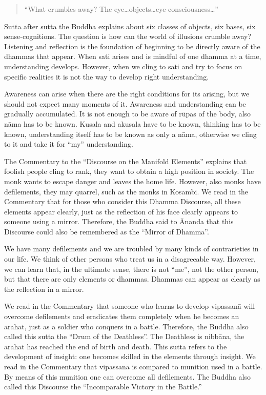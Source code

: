 \begin{quote}
``What crumbles away? The eye\ldots objects\ldots eye-consciousness\ldots ''
\end{quote}

Sutta after sutta the Buddha explains about six classes of objects, six bases, six sense-cognitions.
The question is how can the world of illusions crumble away? Listening and reflection is the foundation of beginning to be directly aware of the dhammas that appear. When sati arises and is mindful of one dhamma at a time, understanding develops. However, when we cling to sati and try to focus on specific realities it is not the way to develop right understanding.

Awareness can arise when there are the right conditions for its arising, but we should not expect many moments of it. Awareness and understanding can be gradually accumulated. It is not enough to be aware of rūpas of the body, also nāma has to be known. Kusala and akusala have to be known, thinking has to be known, understanding itself has to be known as only a nāma, otherwise we cling to it and take it for ``my'' understanding.

The Commentary to the ``Discourse on the Manifold Elements'' explains that foolish people cling to rank, they want to obtain a high position in society. The monk wants to escape danger and leaves the home life. However, also monks have defilements, they may quarrel, such as the monks in Kosambi. We read in the Commentary that for those who consider this Dhamma Discourse, all these elements appear clearly, just as the reflection of his face clearly appears to someone using a mirror. Therefore, the Buddha said to Ānanda that this Discourse could also be remembered as the ``Mirror of Dhamma''.

We have many defilements and we are troubled by many kinds of contrarieties in our life. We think of other persons who treat us in a disagreeable way. However, we can learn that, in the ultimate sense, there is not ``me'', not the other person, but that there are only elements or dhammas. Dhammas can appear as clearly as the reflection in a mirror.

We read in the Commentary that someone who learns to develop vipassanā will overcome defilements and eradicates them completely when he becomes an arahat, just as a soldier who conquers in a battle. Therefore, the Buddha also called this sutta the ``Drum of the Deathless''. The Deathless is nibbāna, the arahat has reached the end of birth and death. This sutta refers to the development of insight: one becomes skilled in the elements through insight. We read in the Commentary that vipassanā is compared to munition used in a battle. By means of this munition one can overcome all defilements. The Buddha also called this Discourse the ``Incomparable Victory in the Battle.''

